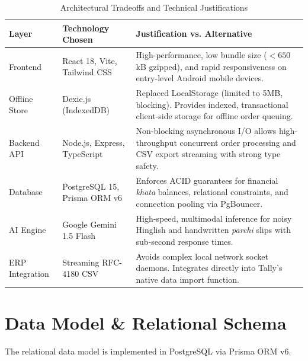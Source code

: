 \documentclass[11pt,a4paper]{article}
\begin{document}
\begin{table}[h!]
\centering
\small
\begin{tabularx}{\textwidth}{l p{3.8cm} X}
\toprule
\textbf{Layer} & \textbf{Technology Chosen} & \textbf{Justification vs. Alternative} \\
\midrule
Frontend & React 18, Vite, Tailwind CSS & High-performance, low bundle size ($<650$ kB gzipped), and rapid responsiveness on entry-level Android mobile devices. \\
\addlinespace
Offline Store & Dexie.js (IndexedDB) & Replaced LocalStorage (limited to 5MB, blocking). Provides indexed, transactional client-side storage for offline order queuing. \\
\addlinespace
Backend API & Node.js, Express, TypeScript & Non-blocking asynchronous I/O allows high-throughput concurrent order processing and CSV export streaming with strong type safety. \\
\addlinespace
Database & PostgreSQL 15, Prisma ORM v6 & Enforces ACID guarantees for financial \textit{khata} balances, relational constraints, and connection pooling via PgBouncer. \\
\addlinespace
AI Engine & Google Gemini 1.5 Flash & High-speed, multimodal inference for noisy Hinglish and handwritten \textit{parchi} slips with sub-second response times. \\
\addlinespace
ERP Integration & Streaming RFC-4180 CSV & Avoids complex local network socket daemons. Integrates directly into Tally's native data import function. \\
\bottomrule
\end{tabularx}
\caption{Architectural Tradeoffs and Technical Justifications}
\end{table}

\section{Data Model \& Relational Schema}

The relational data model is implemented in PostgreSQL via Prisma ORM v6.
\end{document}

